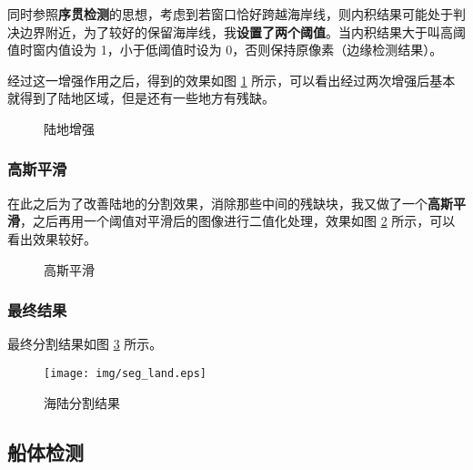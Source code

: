 \documentclass[UTF8,12pt]{ctexart}
\begin{document}
同时参照\textbf{序贯检测}的思想，考虑到若窗口恰好跨越海岸线，则内积结果可能处于判决边界附近，为了较好的保留海岸线，我\textbf{设置了两个阈值}。当内积结果大于叫高阈值时窗内值设为 1，小于低阈值时设为 0，否则保持原像素（边缘检测结果）。

经过这一增强作用之后，得到的效果如图 \ref{img_enhance} 所示，可以看出经过两次增强后基本就得到了陆地区域，但是还有一些地方有残缺。

\begin{figure}[!htbp]
	\centering
	\caption{陆地增强}
	\label{img_enhance}
\end{figure}

\subsubsection{高斯平滑}

在此之后为了改善陆地的分割效果，消除那些中间的残缺块，我又做了一个\textbf{高斯平滑}，之后再用一个阈值对平滑后的图像进行二值化处理，效果如图 \ref{img_smooth} 所示，可以看出效果较好。

\begin{figure}[!htbp]
	\centering
	\caption{高斯平滑}
	\label{img_smooth}
\end{figure}

\subsubsection{最终结果}

最终分割结果如图 \ref{img_land} 所示。

\begin{figure}[!htbp]
	\centering
	\texttt{[image: img/seg\_land.eps]}
	\caption{海陆分割结果}
	\label{img_land}
\end{figure}



\subsection{船体检测}
\end{document}
